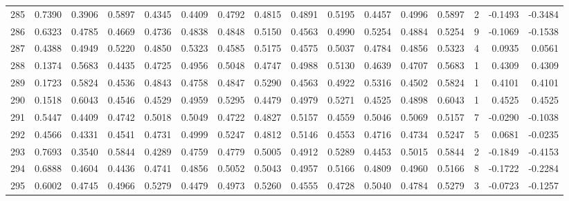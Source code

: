 \begin{tabular}{lrrrrrrrrrrrrrrr}
285 &      0.7390 &  0.3906 &  0.5897 &  0.4345 &  0.4409 &  0.4792 &  0.4815 &  0.4891 &  0.5195 &  0.4457 &   0.4996 &     0.5897 &      2 &                   -0.1493 &                    -0.3484 \\
286 &      0.6323 &  0.4785 &  0.4669 &  0.4736 &  0.4838 &  0.4848 &  0.5150 &  0.4563 &  0.4990 &  0.5254 &   0.4884 &     0.5254 &      9 &                   -0.1069 &                    -0.1538 \\
287 &      0.4388 &  0.4949 &  0.5220 &  0.4850 &  0.5323 &  0.4585 &  0.5175 &  0.4575 &  0.5037 &  0.4784 &   0.4856 &     0.5323 &      4 &                    0.0935 &                     0.0561 \\
288 &      0.1374 &  0.5683 &  0.4435 &  0.4725 &  0.4956 &  0.5048 &  0.4747 &  0.4988 &  0.5130 &  0.4639 &   0.4707 &     0.5683 &      1 &                    0.4309 &                     0.4309 \\
289 &      0.1723 &  0.5824 &  0.4536 &  0.4843 &  0.4758 &  0.4847 &  0.5290 &  0.4563 &  0.4922 &  0.5316 &   0.4502 &     0.5824 &      1 &                    0.4101 &                     0.4101 \\
290 &      0.1518 &  0.6043 &  0.4546 &  0.4529 &  0.4959 &  0.5295 &  0.4479 &  0.4979 &  0.5271 &  0.4525 &   0.4898 &     0.6043 &      1 &                    0.4525 &                     0.4525 \\
291 &      0.5447 &  0.4409 &  0.4742 &  0.5018 &  0.5049 &  0.4722 &  0.4827 &  0.5157 &  0.4559 &  0.5046 &   0.5069 &     0.5157 &      7 &                   -0.0290 &                    -0.1038 \\
292 &      0.4566 &  0.4331 &  0.4541 &  0.4731 &  0.4999 &  0.5247 &  0.4812 &  0.5146 &  0.4553 &  0.4716 &   0.4734 &     0.5247 &      5 &                    0.0681 &                    -0.0235 \\
293 &      0.7693 &  0.3540 &  0.5844 &  0.4289 &  0.4759 &  0.4779 &  0.5005 &  0.4912 &  0.5289 &  0.4453 &   0.5015 &     0.5844 &      2 &                   -0.1849 &                    -0.4153 \\
294 &      0.6888 &  0.4604 &  0.4436 &  0.4741 &  0.4856 &  0.5052 &  0.5043 &  0.4957 &  0.5166 &  0.4809 &   0.4960 &     0.5166 &      8 &                   -0.1722 &                    -0.2284 \\
295 &      0.6002 &  0.4745 &  0.4966 &  0.5279 &  0.4479 &  0.4973 &  0.5260 &  0.4555 &  0.4728 &  0.5040 &   0.4784 &     0.5279 &      3 &                   -0.0723 &                    -0.1257 \\

\end{tabular}
